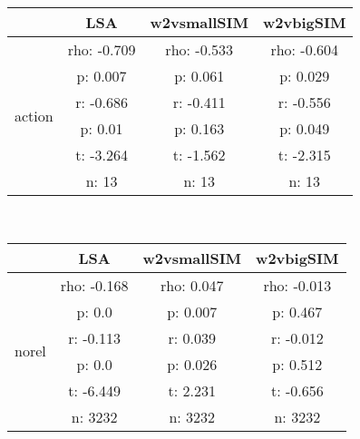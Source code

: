 \documentclass{article}
\begin{document}
\begin{tabular}{cccc|}\cline{2-4}
&\multicolumn{1}{|c}{LSA} & w2vsmallSIM & w2vbigSIM \\\hline
\multicolumn{1}{|c|}{\multirow{6}{*}{action}} & rho: -0.709 & rho: -0.533 & rho: -0.604 \\
\multicolumn{1}{|c|}{} & p: 0.007 & p: 0.061 & p: 0.029 \\
\multicolumn{1}{|c|}{} & r: -0.686 & r: -0.411 & r: -0.556 \\
\multicolumn{1}{|c|}{} & p: 0.01 & p: 0.163 & p: 0.049 \\
\multicolumn{1}{|c|}{} & t: -3.264 & t: -1.562 & t: -2.315 \\
\multicolumn{1}{|c|}{} & n: 13 & n: 13 & n: 13 \\
\hline
\end{tabular}\\
\begin{tabular}{cccc|}\cline{2-4}
&\multicolumn{1}{|c}{LSA} & w2vsmallSIM & w2vbigSIM \\\hline
\multicolumn{1}{|c|}{\multirow{6}{*}{norel}} & rho: -0.168 & rho: 0.047 & rho: -0.013 \\
\multicolumn{1}{|c|}{} & p: 0.0 & p: 0.007 & p: 0.467 \\
\multicolumn{1}{|c|}{} & r: -0.113 & r: 0.039 & r: -0.012 \\
\multicolumn{1}{|c|}{} & p: 0.0 & p: 0.026 & p: 0.512 \\
\multicolumn{1}{|c|}{} & t: -6.449 & t: 2.231 & t: -0.656 \\
\multicolumn{1}{|c|}{} & n: 3232 & n: 3232 & n: 3232 \\
\hline
\end{tabular}\\
\end{document}
